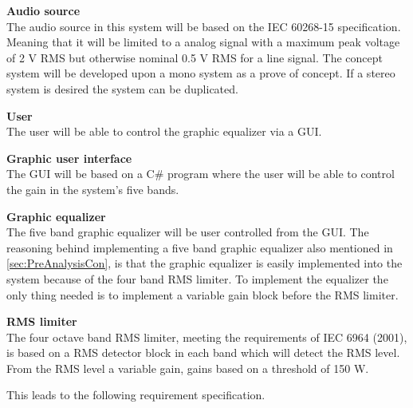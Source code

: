 \textbf{Audio source} \\
The audio source in this system will be based on the IEC 60268-15 specification. Meaning that it will be limited to a analog signal with a maximum peak voltage of 2 V RMS but otherwise nominal 0.5 V RMS for a line signal. The concept system will be developed upon a mono system as a prove of concept. If a stereo system is desired the system can be duplicated. %

\textbf{User} \\
The user will be able to control the graphic equalizer via a GUI. 

\textbf{Graphic user interface}\\
The GUI will be based on a C\# program where the user will be able to control the gain in the system's five bands.

\textbf{Graphic equalizer}\\
The five band graphic equalizer will be user controlled from the GUI. The reasoning behind implementing a five band graphic equalizer also mentioned in \autoref{sec:PreAnalysisCon}, is that the graphic equalizer is easily implemented into the system because of the four band RMS limiter. To implement the equalizer the only thing needed is to implement a variable gain block before the RMS limiter.

\textbf{RMS limiter}\\
The four octave band RMS limiter, meeting the requirements of IEC 6964 (2001), is based on a RMS detector block in each band which will detect the RMS level. From the RMS level a variable gain, gains based on a threshold of 150 W. 

This leads to the following requirement specification. 














